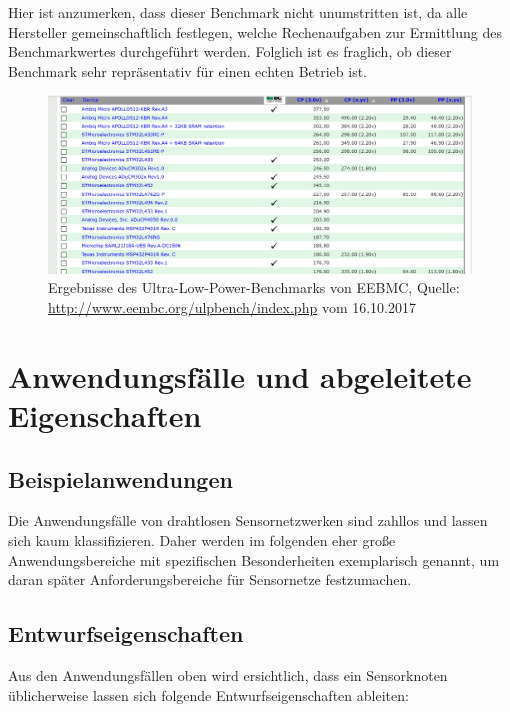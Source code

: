 Hier ist anzumerken, dass dieser Benchmark nicht unumstritten ist, da alle Hersteller gemeinschaftlich festlegen, welche Rechenaufgaben zur Ermittlung des Benchmarkwertes durchgeführt werden. Folglich ist es fraglich, ob dieser Benchmark sehr repräsentativ für einen echten Betrieb ist.

\begin{figure}[!ht]
\centering
\includegraphics[width=12cm]{your_content_folder/your_figures/fig_intro/ulp_bench.png}
\caption{Ergebnisse des Ultra-Low-Power-Benchmarks von EEBMC, Quelle: \url{http://www.eembc.org/ulpbench/index.php} vom 16.10.2017}
\label{fig_ulp_bench}
\end{figure}

\section{Anwendungsfälle und abgeleitete Eigenschaften}
\subsection{Beispielanwendungen}
Die Anwendungsfälle von drahtlosen Sensornetzwerken sind zahllos und lassen sich kaum klassifizieren. Daher werden im folgenden eher große Anwendungsbereiche mit spezifischen Besonderheiten exemplarisch genannt, um daran später Anforderungsbereiche für Sensornetze festzumachen.



\subsection{Entwurfseigenschaften}

Aus den Anwendungsfällen oben wird ersichtlich, dass ein Sensorknoten üblicherweise lassen sich folgende Entwurfseigenschaften ableiten:

